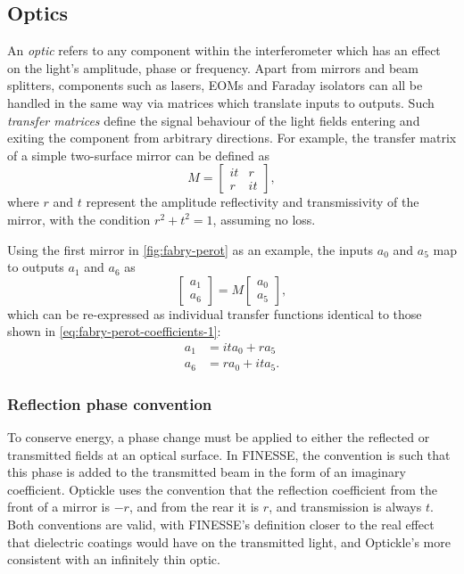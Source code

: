 \subsection{Optics}
An \emph{optic} refers to any component within the interferometer which has an effect on the light's amplitude, phase or frequency. Apart from mirrors and beam splitters, components such as lasers, \glspl{EOM} and Faraday isolators can all be handled in the same way via matrices which translate inputs to outputs. Such \emph{transfer matrices} define the signal behaviour of the light fields entering and exiting the component from arbitrary directions. For example, the transfer matrix of a simple two-surface mirror can be defined as~\cite{Freise2010}
\begin{equation}
  M =
  \begin{bmatrix}
    it & r \\
    r & it
  \end{bmatrix},
\end{equation}
where $r$ and $t$ represent the amplitude reflectivity and transmissivity of the mirror, with the condition $r^2 + t^2 = 1$, assuming no loss.

Using the first mirror in \cref{fig:fabry-perot} as an example, the inputs $a_0$ and $a_5$ map to outputs $a_1$ and $a_6$ as
\begin{equation}
  \begin{bmatrix}
    a_1 \\
    a_6
  \end{bmatrix}
  =
  M
  \begin{bmatrix}
    a_0 \\
    a_5
  \end{bmatrix}
  ,
\end{equation}
which can be re-expressed as individual transfer functions identical to those shown in \cref{eq:fabry-perot-coefficients-1}:
\begin{equation}
  \begin{split}
    a_1 &= it a_0 + r a_5 \\
    a_6 &= r a_0 + it a_5.
  \end{split}
\end{equation}

\subsubsection{\label{a:reflection-phase}Reflection phase convention}
To conserve energy, a phase change must be applied to either the reflected or transmitted fields at an optical surface. In \gls{FINESSE}, the convention is such that this phase is added to the transmitted beam in the form of an imaginary coefficient. Optickle uses the convention that the reflection coefficient from the front of a mirror is $-r$, and from the rear it is $r$, and transmission is always $t$. Both conventions are valid, with \gls{FINESSE}'s definition closer to the real effect that dielectric coatings would have on the transmitted light, and Optickle's more consistent with an infinitely thin optic.

